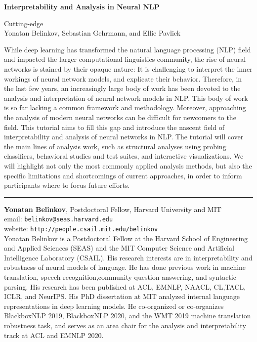 \begin{center}
    \Large{\textbf{Interpretability and Analysis in Neural NLP}\\}
    \par\bigskip
    \large{Cutting-edge}\\
    \large{Yonatan Belinkov, Sebastian Gehrmann, and Ellie Pavlick}\\
    \par\bigskip
    [Website]

\end{center}

While deep learning has transformed the natural language processing (NLP) field and impacted the larger computational linguistics community, the rise of neural networks is stained by their opaque nature: It is challenging to
interpret the inner workings of neural network models, and explicate their behavior. Therefore, in the last few years,
an increasingly large body of work has been devoted to the analysis and interpretation of neural network models in
NLP. This body of work is so far lacking a common framework and methodology. Moreover, approaching the analysis
of modern neural networks can be difficult for newcomers to the field. This tutorial aims to fill this gap and introduce the nascent field of interpretability and analysis of neural networks in NLP. The tutorial will cover the main lines
of analysis work, such as structural analyses using probing classifiers, behavioral studies and test suites, and interactive visualizations. We will highlight not only the most commonly applied analysis methods, but also the specific
limitations and shortcomings of current approaches, in order to inform participants where to focus future efforts.

\begin{center}
    \noindent\rule{200px}{1pt}
\end{center}

\textbf{Yonatan Belinkov}, Postdoctoral Fellow, Harvard University and MIT\\

email: \texttt{belinkov@seas.harvard.edu}\\
website: \texttt{http://people.csail.mit.edu/belinkov}\\
Yonatan Belinkov is a Postdoctoral Fellow at the Harvard School of Engineering and Applied Sciences (SEAS) and the MIT Computer Science and Artificial Intelligence Laboratory (CSAIL). His research interests are in interpretability and robustness of neural models of language. He has done previous work in machine translation, speech recognition,community question answering, and syntactic parsing. His research has been published at ACL, EMNLP, NAACL, CL,TACL, ICLR, and NeurIPS. His PhD dissertation at MIT analyzed internal language representations in deep learning models. He co-organized or co-organizes BlackboxNLP 2019, BlackboxNLP 2020, and the WMT 2019 machine translation robustness task, and serves as an area chair for the analysis and interpretability track at ACL and EMNLP 2020.